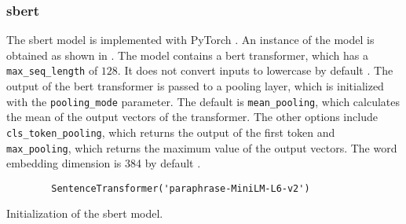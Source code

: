 \subsubsection*{\ac{sbert}}\label{subsubsec:impl-sbert}

The \ac{sbert} model is implemented with PyTorch \cite{HfsentTrans2019}.
An instance of the model is obtained as shown in .
The model contains a \ac{bert} transformer, which has a \texttt{max\_seq\_length} of $128$. 
It does not convert inputs to lowercase by default \cite{sbert-dev}.
The output of the \ac{bert} transformer is passed to a pooling layer, which is initialized with the \texttt{pooling\_mode} parameter.
The default is \texttt{mean\_pooling}, which calculates the mean of the output vectors of the transformer.
The other options include \texttt{cls\_token\_pooling}, which returns the output of the first token and 
\texttt{max\_pooling}, which returns the maximum value of the output vectors.
The word embedding dimension is 384 by default \cite{sbert-dev}.

\begin{listing}[htp]
    \begin{verbatim}
        SentenceTransformer('paraphrase-MiniLM-L6-v2')
    \end{verbatim}
    \caption[Initialization of the \ac{sbert} model]{Initialization of the \ac{sbert} model.
    }
    \label{lst:impl-sbert}
\end{listing}